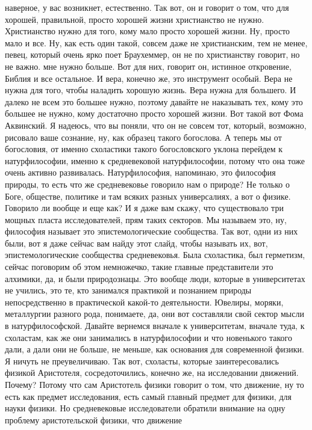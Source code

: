 наверное, у вас возникнет, естественно. Так вот, он и говорит о том, что для
хорошей, правильной, просто хорошей жизни христианство не нужно. Христианство
нужно для того, кому мало просто хорошей жизни. Ну, просто мало и все. Ну, как
есть один такой, совсем даже не христианским, тем не менее, певец, который очень
ярко поет Браухеммер, он не по христианству говорит, но не важно. мне нужно
больше. Вот для них, говорит он, истинное откровение, Библия и все остальное. И
вера, конечно же, это инструмент особый. Вера не нужна для того, чтобы наладить
хорошую жизнь. Вера нужна для большего. И далеко не всем это большее нужно,
поэтому давайте не наказывать тех, кому это большее не нужно, кому достаточно
просто хорошей жизни. Вот такой вот Фома Аквинский. Я надеюсь, что вы поняли,
что он не совсем тот, который, возможно, рисовало ваше сознание, ну, как образец
такого богослова. А теперь мы от богословия, от именно схоластики такого
богословского уклона перейдем к натурфилософии, именно к средневековой
натурфилософии, потому что она тоже очень активно развивалась. Натурфилософия,
напоминаю, это философия природы, то есть что же средневековье говорило нам о
природе? Не только о Боге, обществе, политике и там всяких разных универсалиях,
а вот о физике. Говорило ли вообще и еще как? И я даже вам скажу, что
существовало три мощных пласта исследователей, прям таких секторов. Мы называем
это, ну, философия называет это эпистемологические сообщества. Так вот, одни из
них были, вот я даже сейчас вам найду этот слайд, чтобы называть их, вот,
эпистемологические сообщества средневековья. Была схоластика, был герметизм,
сейчас поговорим об этом немножечко, такие главные представители это алхимики,
да, и были природознацы. Это вообще люди, которые в университетах не учились,
это те, кто занимался практикой и познанием природы непосредственно в
практической какой-то деятельности. Ювелиры, моряки, металлургии разного рода,
понимаете, да, они вот составляли свой сектор мысли в натурфилософской. Давайте
вернемся вначале к университетам, вначале туда, к схоластам, как же они
занимались в натурфилософии и что новенького такого дали, а дали они не больше,
не меньше, как основания для современной физики. Я ничуть не преувеличиваю. Так
вот, схоласты, которые заинтересовались физикой Аристотеля, сосредоточились,
конечно же, на исследовании движений. Почему? Потому что сам Аристотель физики
говорит о том, что движение, ну то есть как предмет исследования, есть самый
главный предмет для физики, для науки физики. Но средневековые исследователи
обратили внимание на одну проблему аристотельской физики, что движение
